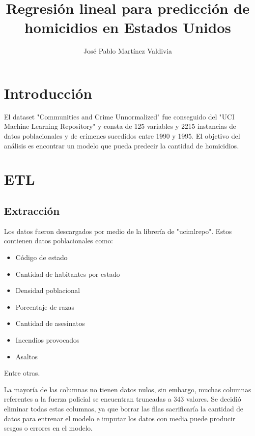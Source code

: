\documentclass[twocolumn]{article}
\title{Regresión lineal para predicción de homicidios en Estados Unidos}
\author{José Pablo Martínez Valdivia}
\begin{document}


\section{Introducción}
El dataset "Communities and Crime Unnormalized" fue conseguido del 
"UCI Machine Learning Repository" y consta de 125 variables y 2215 instancias
de datos poblacionales y de crímenes sucedidos entre 1990 y 1995. El objetivo 
del análisis es encontrar un modelo que pueda predecir la cantidad de homicidios.

\section{ETL}
\subsection{Extracción}
Los datos fueron descargados por medio de la librería de "ucimlrepo". Estos contienen 
datos poblacionales como:
\begin{itemize}
  \item Código de estado
  \item Cantidad de habitantes por estado
  \item Densidad poblacional
  \item Porcentaje de razas
  \item Cantidad de asesinatos
  \item Incendios provocados
  \item Asaltos
\end{itemize}
Entre otras. 

La mayoría de las columnas no tienen datos nulos, sin embargo, muchas columnas 
referentes a la fuerza policial se encuentran truncadas a 343 valores. Se decidió 
eliminar todas estas columnas, ya que borrar las filas sacrificaría la cantidad de 
datos para entrenar el modelo e imputar los datos con media puede producir sesgos o 
errores en el modelo.
\end{document}
